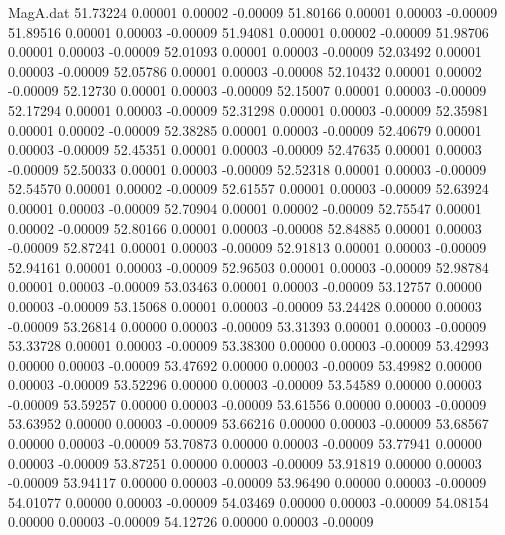 \begin{filecontents}{MagA.dat}
  51.73224    0.00001    0.00002   -0.00009
  51.80166    0.00001    0.00003   -0.00009
  51.89516    0.00001    0.00003   -0.00009
  51.94081    0.00001    0.00002   -0.00009
  51.98706    0.00001    0.00003   -0.00009
  52.01093    0.00001    0.00003   -0.00009
  52.03492    0.00001    0.00003   -0.00009
  52.05786    0.00001    0.00003   -0.00008
  52.10432    0.00001    0.00002   -0.00009
  52.12730    0.00001    0.00003   -0.00009
  52.15007    0.00001    0.00003   -0.00009
  52.17294    0.00001    0.00003   -0.00009
  52.31298    0.00001    0.00003   -0.00009
  52.35981    0.00001    0.00002   -0.00009
  52.38285    0.00001    0.00003   -0.00009
  52.40679    0.00001    0.00003   -0.00009
  52.45351    0.00001    0.00003   -0.00009
  52.47635    0.00001    0.00003   -0.00009
  52.50033    0.00001    0.00003   -0.00009
  52.52318    0.00001    0.00003   -0.00009
  52.54570    0.00001    0.00002   -0.00009
  52.61557    0.00001    0.00003   -0.00009
  52.63924    0.00001    0.00003   -0.00009
  52.70904    0.00001    0.00002   -0.00009
  52.75547    0.00001    0.00002   -0.00009
  52.80166    0.00001    0.00003   -0.00008
  52.84885    0.00001    0.00003   -0.00009
  52.87241    0.00001    0.00003   -0.00009
  52.91813    0.00001    0.00003   -0.00009
  52.94161    0.00001    0.00003   -0.00009
  52.96503    0.00001    0.00003   -0.00009
  52.98784    0.00001    0.00003   -0.00009
  53.03463    0.00001    0.00003   -0.00009
  53.12757    0.00000    0.00003   -0.00009
  53.15068    0.00001    0.00003   -0.00009
  53.24428    0.00000    0.00003   -0.00009
  53.26814    0.00000    0.00003   -0.00009
  53.31393    0.00001    0.00003   -0.00009
  53.33728    0.00001    0.00003   -0.00009
  53.38300    0.00000    0.00003   -0.00009
  53.42993    0.00000    0.00003   -0.00009
  53.47692    0.00000    0.00003   -0.00009
  53.49982    0.00000    0.00003   -0.00009
  53.52296    0.00000    0.00003   -0.00009
  53.54589    0.00000    0.00003   -0.00009
  53.59257    0.00000    0.00003   -0.00009
  53.61556    0.00000    0.00003   -0.00009
  53.63952    0.00000    0.00003   -0.00009
  53.66216    0.00000    0.00003   -0.00009
  53.68567    0.00000    0.00003   -0.00009
  53.70873    0.00000    0.00003   -0.00009
  53.77941    0.00000    0.00003   -0.00009
  53.87251    0.00000    0.00003   -0.00009
  53.91819    0.00000    0.00003   -0.00009
  53.94117    0.00000    0.00003   -0.00009
  53.96490    0.00000    0.00003   -0.00009
  54.01077    0.00000    0.00003   -0.00009
  54.03469    0.00000    0.00003   -0.00009
  54.08154    0.00000    0.00003   -0.00009
  54.12726    0.00000    0.00003   -0.00009

\end{filecontents}
